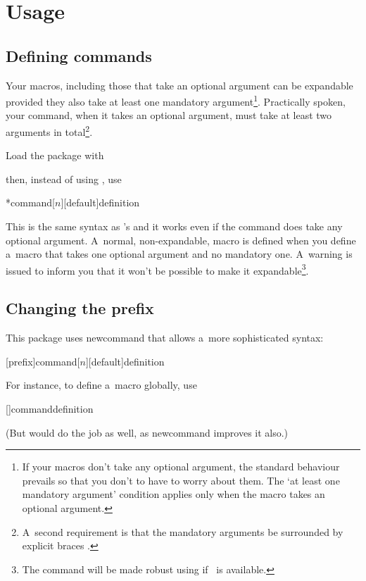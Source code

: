\documentclass{article}
\newcommand*{\pack}{\textsf}
\begin{document}
\section{Usage}

\subsection{Defining commands}

Your macros, including those that take an optional argument can be
expandable provided they also take at least one mandatory
argument\footnote{If your macros don't take any optional argument, the
  standard behaviour prevails so that you don't to have to worry about
  them.  The `at least one mandatory argument' condition applies only
  when the macro takes an optional argument.}.  Practically spoken,
your command, when it takes an optional argument, must take at least
two arguments in total\footnote{A~second requirement is that the
  mandatory arguments be surrounded by explicit braces \tex{\{\dots\}}.}.

Load the package with
%
\begin{texcode}
\end{texcode}
%
then, instead of using , use 
%
\begin{texcode}
*{\<command\>}[$n$][\<default\>]{\<definition\>}
\end{texcode}
%
This is the same syntax as 's and it works even if the
command does take any optional argument.  A~normal, non-expandable,
macro is defined when you define a~macro that takes one optional argument
and no mandatory one.  A~warning is issued to inform you that it won't
be possible to make it expandable\footnote{The command will be made
  robust using  if \eTeX\ is available.}.

\subsection{Changing the prefix}

This package uses \pack{newcommand} that allows a~more sophisticated
syntax:
%
\begin{texcode}
[\<prefix\>]{\<command\>}[$n$][\<default\>]{\<definition\>}
\end{texcode}
%
For instance, to define a~macro globally, use
%
\begin{texcode}
[]{\<command\>}{\<definition\>}
\end{texcode}
%
(But  would do the job as well, as \pack{newcommand}
improves it also.)
\end{document}
